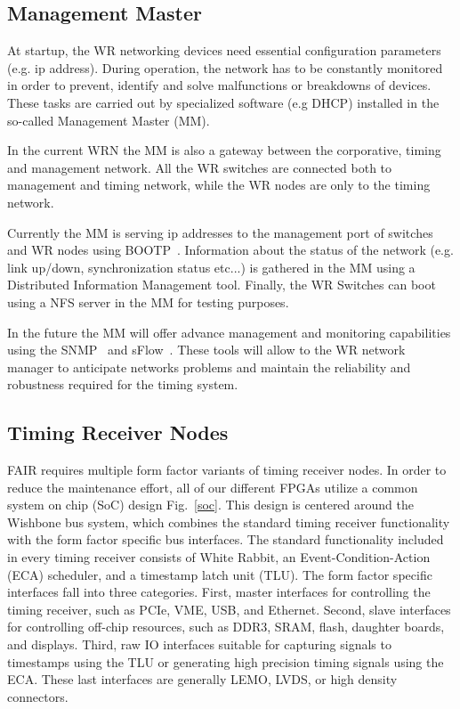 \documentclass{JAC2003}
\begin{document}
\subsection{Management Master}

At startup, the WR networking devices need essential configuration parameters (e.g. ip
address). During operation, the network has to be constantly monitored in
order to prevent, identify and solve malfunctions or breakdowns of devices. 
These tasks are carried out by specialized software (e.g DHCP) installed in the
so-called Management Master (MM). 

In the current WRN the MM is also a gateway between the corporative, timing and management 
network. All the WR switches are connected both to management and timing
network, while the WR nodes are only to the timing network. 

Currently the MM is serving ip addresses to the management port of switches and WR
nodes using BOOTP~\cite{bootp}. Information about the status of the network (e.g.
link up/down, synchronization status etc...) is gathered in the MM using a
Distributed Information Management
tool. Finally, the WR Switches can boot using a NFS server in the MM for testing
purposes. 

In the future the MM will offer advance management and monitoring capabilities
using the SNMP~\cite{snmp} and sFlow~\cite{sflow}. These tools will allow to the 
WR network manager to anticipate networks problems and maintain the reliability
and robustness required for the timing system.


\subsection{Timing Receiver Nodes}

FAIR requires multiple form factor variants of timing receiver nodes.
In order to reduce the maintenance effort,
all of our different FPGAs utilize a common system on chip (SoC)
design Fig.~\ref{soc}.
This design is centered around the Wishbone bus system,
which combines the standard timing receiver functionality with 
the form factor specific bus interfaces.
The standard functionality included in every timing receiver
consists of White Rabbit, an Event-Condition-Action (ECA) scheduler,
and a timestamp latch unit (TLU).
The form factor specific interfaces fall into three categories.
First, master interfaces for controlling the timing receiver,
such as PCIe, VME, USB, and Ethernet.
Second, slave interfaces for controlling off-chip resources,
such as DDR3, SRAM, flash, daughter boards, and displays.
Third, raw IO interfaces suitable for capturing signals to 
timestamps using the TLU or generating high precision timing
signals using the ECA.
These last interfaces are generally LEMO, LVDS, or high density connectors.
\end{document}

